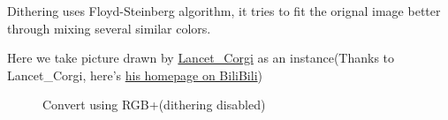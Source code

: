 \documentclass{article}
\begin{document}
    Dithering uses Floyd-Steinberg algorithm, it tries to fit the orignal image better through mixing several similar colors.
    
    Here we take picture drawn by \href{https://t.bilibili.com/544583492149793294}{Lancet\_Corgi} as an instance(Thanks to Lancet\_Corgi, here's \href{https://space.bilibili.com/37171000}{his homepage on BiliBili})
    
    \begin{figure}[htbp]
        \centering
        \setcounter{subfigure}{0}
        \caption{Convert using RGB+(dithering disabled)}
    \end{figure}
    
\end{document}
